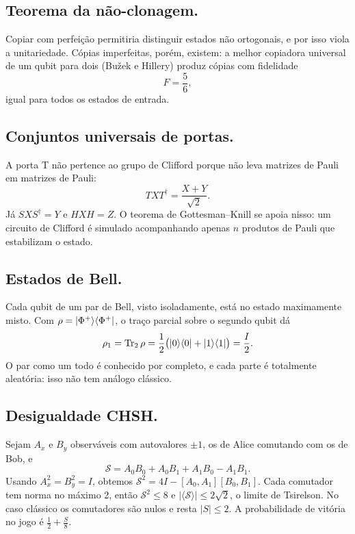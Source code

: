 \subsection{Teorema da não-clonagem.}
Copiar com perfeição permitiria distinguir estados não ortogonais, e por isso viola a unitariedade. Cópias imperfeitas, porém, existem: a melhor copiadora universal de um qubit para dois (Bu\v{z}ek e Hillery) produz cópias com fidelidade
\begin{equation}
    F = \frac56,
\end{equation}
igual para todos os estados de entrada.

\subsection{Conjuntos universais de portas.}
A porta T não pertence ao grupo de Clifford porque não leva matrizes de Pauli em matrizes de Pauli:
\begin{equation}
    T X T^\dagger = \frac{X + Y}{\sqrt2}.
\end{equation}
Já $S X S^\dagger = Y$ e $H X H = Z$. O teorema de Gottesman--Knill se apoia nisso: um circuito de Clifford é simulado acompanhando apenas $n$ produtos de Pauli que estabilizam o estado.

\subsection{Estados de Bell.}
Cada qubit de um par de Bell, visto isoladamente, está no estado maximamente misto. Com $\rho = |{\Phi^+}\rangle\langle{\Phi^+}|$, o traço parcial sobre o segundo qubit dá
\begin{equation}
    \rho_1 = \mathrm{Tr}_2\,\rho = \frac12\big(|{0}\rangle\langle{0}| + |{1}\rangle\langle{1}|\big) = \frac{I}{2}.
\end{equation}
O par como um todo é conhecido por completo, e cada parte é totalmente aleatória: isso não tem análogo clássico.

\subsection{Desigualdade CHSH.}
Sejam $A_x$ e $B_y$ observáveis com autovalores $\pm1$, os de Alice comutando com os de Bob, e
\begin{equation}
    \mathcal{S} = A_0B_0 + A_0B_1 + A_1B_0 - A_1B_1.
\end{equation}
Usando $A_x^2=B_y^2=I$, obtemos $\mathcal{S}^2 = 4I - [A_0,A_1][B_0,B_1]$. Cada comutador tem norma no máximo 2, então $\mathcal{S}^2 \le 8$ e $|\langle\mathcal{S}\rangle|\le 2\sqrt2$, o limite de Tsirelson. No caso clássico os comutadores são nulos e resta $|S|\le2$. A probabilidade de vitória no jogo é $\frac12 + \frac{S}{8}$.

